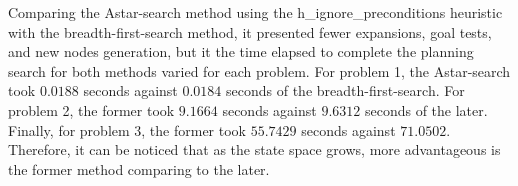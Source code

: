 \documentclass[12pt, a4paper]{article}
\begin{document}
	Comparing the Astar-search method using the h{\_}ignore{\_}preconditions heuristic with the breadth-first-search method, it presented fewer expansions, goal tests, and new nodes generation, but it the time elapsed to complete the planning search for both methods varied for each problem. For problem 1, the Astar-search took $0.0188$ seconds against $0.0184$ seconds of the breadth-first-search. For problem 2, the former took $9.1664$ seconds against $9.6312$ seconds of the later. Finally, for problem 3, the former took $55.7429$ seconds against $71.0502$. Therefore, it can be noticed that as the state space grows, more advantageous is the former method comparing to the later.
	
\end{document}
